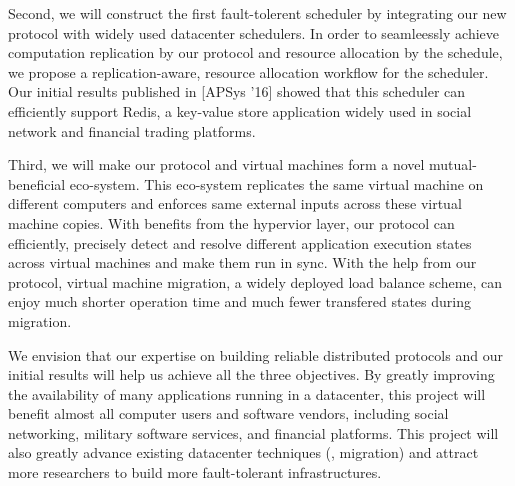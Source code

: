 
Second, we will construct the first fault-tolerent scheduler by integrating our 
new protocol with widely used datacenter schedulers. In order to seamleessly 
achieve computation replication by our protocol and resource allocation by the 
schedule, we propose a replication-aware, resource allocation workflow for the 
scheduler. Our initial results published in [APSys '16] showed that this 
scheduler can efficiently support Redis, a key-value store application widely 
used in social network and financial trading platforms.

Third, we will make our protocol and virtual machines form a novel 
mutual-beneficial eco-system. This eco-system replicates the same virtual 
machine on different computers and enforces same external inputs 
across these virtual machine copies. With benefits from the hypervior layer, 
our protocol can efficiently, precisely detect and resolve different 
application execution states across virtual machines and make them run in sync. 
With the help from our protocol, virtual machine migration, a widely deployed 
load balance scheme, can enjoy much shorter operation time and much fewer 
transfered states during migration.

We envision that our expertise on building reliable distributed protocols and 
our initial results will help us achieve all the three objectives. By greatly 
improving the availability of many applications running in a datacenter, this 
project will benefit almost all computer users and software vendors, including 
social networking, military software services, and financial platforms. This 
project will also greatly advance existing datacenter techniques (\eg, 
migration) and attract more researchers to build more fault-tolerant 
infrastructures.


